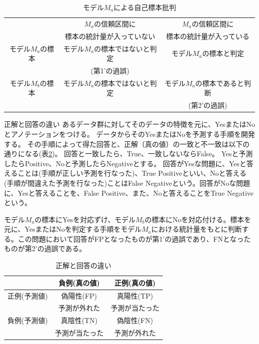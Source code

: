 \begin{table}[hbtp]
    \caption{モデル$M_a$による自己標本批判}
    \label{table:type_error}
    \centering
    \begin{tabular}{ccc}
      \hline
        &  $M_a$の信頼区間に &  $M_a$の信頼区間に \\
        & 標本の統計量が入っていない & 標本の統計量が入っている \\
      \hline \hline
      モデル$M_a$の標本  & モデル$M_a$の標本ではないと判定  & モデル$M_a$の標本と判定 \\
      & (第1'の過誤) & \\
      モデル$M_b$の標本  & モデル$M_a$の標本ではないと判定   & モデル$M_a$の標本であると判断 \\
      & & (第2'の過誤) \\
      \hline
    \end{tabular}
  \end{table}


\begin{SMbox}{正解と回答の違い}
    あるデータ群に対してそのデータの特徴を元に、YesまたはNoとアノテーションをつける。
    データからそのYesまたはNoを予測する手順を開発する。
    その手順によって得た回答と、正解（真の値）の一致と不一致は以下の通りになる(表\ref{table:Yes_no_answer})。
    回答と一致したら、True、一致しないならFalse。
    Yesと予測したらPositive、Noと予測したらNegativeとする。
    回答がYesな問題に、Yesと答えることは(手順が正しい予測を行なった)、True Positiveといい、Noと答える(手順が間違えた予測を行なった)ことはFalse Negativeという。回答がNoな問題に、Yesと答えることを、False Positive、また、Noと答えることをTrue Negativeという。

    モデル$M_a$の標本にYesを対応ずけ、モデル$M_b$の標本にNoを対応付ける。標本を元に、YesまたはNoを判定する手順をモデル$M_a$における統計量をもとに判断する。この問題において回答がFPとなったものが第1'の過誤であり、FNとなったものが第2'の過誤である。
    \end{SMbox}
    
    
    \begin{table}[hbtp]
    \caption{正解と回答の違い}
    \label{table:Yes_no_answer}
    \centering
    \begin{tabular}{ccc}
          &  負例(真の値) & 正例(真の値)  \\
        \hline \hline
        正例(予測値) &  偽陽性(FP)  & 真陽性(TP)\\
        &予測が外れた & 予測が当たった\\
        負例(予測値) & 真陰性(TN) & 偽陰性(FN)\\
        & 予測が当たった & 予測が外れた\\
        \hline
    \end{tabular}
    \end{table}

